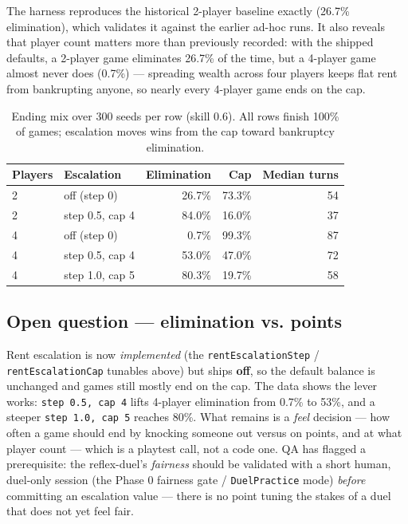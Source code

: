 \documentclass[11pt,a4paper]{article}
\newcommand{\code}[1]{\texttt{#1}}
\begin{document}
The harness reproduces the historical 2-player baseline exactly
(26.7\% elimination), which validates it against the earlier ad-hoc runs. It
also reveals that player count matters more than previously recorded: with the
shipped defaults, a 2-player game eliminates 26.7\% of the time, but a 4-player
game almost never does (0.7\%) --- spreading wealth across four players keeps
flat rent from bankrupting anyone, so nearly every 4-player game ends on the cap.

\begin{table}[h]
\centering
\small
\begin{tabular}{@{}llrrr@{}}
\toprule
\textbf{Players} & \textbf{Escalation} & \textbf{Elimination} & \textbf{Cap} & \textbf{Median turns} \\
\midrule
2 & off (step 0)        & 26.7\% & 73.3\% & 54 \\
2 & step 0.5, cap 4     & 84.0\% & 16.0\% & 37 \\
4 & off (step 0)        &  0.7\% & 99.3\% & 87 \\
4 & step 0.5, cap 4     & 53.0\% & 47.0\% & 72 \\
4 & step 1.0, cap 5     & 80.3\% & 19.7\% & 58 \\
\bottomrule
\end{tabular}
\caption{Ending mix over 300 seeds per row (skill 0.6). All rows finish 100\%
of games; escalation moves wins from the cap toward bankruptcy elimination.}
\end{table}

\subsection{Open question --- elimination vs. points}
Rent escalation is now \emph{implemented} (the \code{rentEscalationStep} /
\code{rentEscalationCap} tunables above) but ships \textbf{off}, so the default
balance is unchanged and games still mostly end on the cap. The data shows the
lever works: \code{step 0.5, cap 4} lifts 4-player elimination from 0.7\% to
53\%, and a steeper \code{step 1.0, cap 5} reaches 80\%. What remains is a
\emph{feel} decision --- how often a game should end by knocking someone out
versus on points, and at what player count --- which is a playtest call, not a
code one. QA has flagged a prerequisite: the reflex-duel's \emph{fairness}
should be validated with a short human, duel-only session (the Phase 0 fairness
gate / \code{DuelPractice} mode) \emph{before} committing an escalation value ---
there is no point tuning the stakes of a duel that does not yet feel fair.
\end{document}

